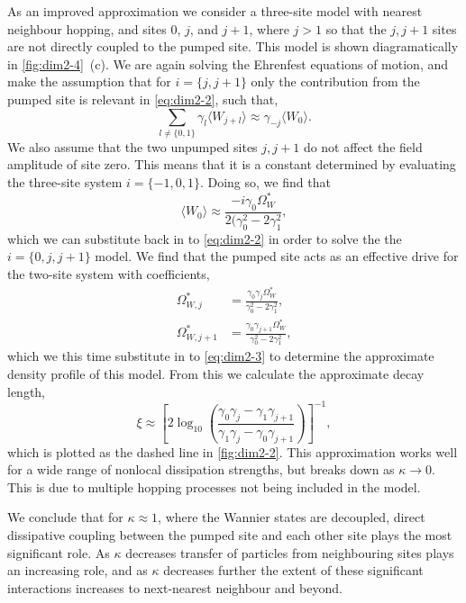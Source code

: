 As an improved approximation we consider a three-site model with nearest neighbour hopping, and sites 0, \(j\), and \(j+1\), where \(j > 1\) so that the \(j,j+1\) sites are not directly coupled to the pumped site. This model is shown diagramatically in \cref{fig:dim2-4}~(c). We are again solving the Ehrenfest equations of motion, and make the assumption that for \(i=\{j,j+1\}\) only the contribution from the pumped site is relevant in \cref{eq:dim2-2}, such that,
\begin{equation}
	\sum_{l \neq \{0,1\}} \gamma_{l} \langle W_{j+l} \rangle \approx \gamma_{-j} \langle W_{0} \rangle.
	\label{eq:dim2-15}
\end{equation}
We also assume that the two unpumped sites \(j, j+1\) do not affect the field amplitude of site zero. This means that it is a constant determined by evaluating the three-site system \(i=\{-1,0,1\}\). Doing so, we find that
\begin{equation}
	\langle W_{0} \rangle \approx \frac{-i\gamma_{0}\Omega_{W}^{*}}{2(\gamma_{0}^{2} - 2\gamma_{1}^{2}},
	\label{eq:dim2-16}
\end{equation}
which we can substitute back in to \cref{eq:dim2-2} in order to solve the the \(i=\{0,j,j+1\}\) model. We find that the pumped site acts as an effective drive for the two-site system with coefficients,
\begin{align}
	\Omega_{W,j}^{*} &= \frac{\gamma_{0}\gamma_{j}\Omega_{W}^{*}}{\gamma_{0}^{2} - 2\gamma_{1}^{2}}, \label{eq:dim2-17} \\
	\Omega_{W,j+1}^{*} &= \frac{\gamma_{0}\gamma_{j+1}\Omega_{W}^{*}}{\gamma_{0}^{2} - 2\gamma_{1}^{2}}, \label{eq:dim2-18}
\end{align}
which we this time substitute in to \cref{eq:dim2-3} to determine the approximate density profile of this model. From this we calculate the approximate decay length,
\begin{equation}
	\xi \approx \left[ 2\log_{10}\left(\frac{\gamma_{0}\gamma_{j} - \gamma_{1}\gamma_{j+1}}{\gamma_{1}\gamma_{j} - \gamma_{0}\gamma_{j+1}}\right)\right]^{-1},
	\label{eq:dim2-19}
\end{equation}
which is plotted as the dashed line in \cref{fig:dim2-2}. This approximation works well for a wide range of nonlocal dissipation strengths, but breaks down as \(\kappa \rightarrow 0\). This is due to multiple hopping processes not being included in the model. 

We conclude that for \(\kappa \approx 1\), where the Wannier states are decoupled, direct dissipative coupling between the pumped site and each other site plays the most significant role. As \(\kappa\) decreases transfer of particles from neighbouring sites plays an increasing role, and as \(\kappa\) decreases further the extent of these significant interactions increases to next-nearest neighbour and beyond. 

